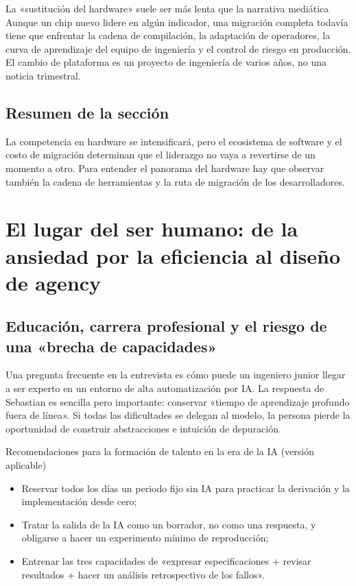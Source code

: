 \documentclass[a4paper]{article}
\begin{document}
\begin{warningbox}{La «sustitución del hardware» suele ser más lenta que la narrativa mediática}
Aunque un chip nuevo lidere en algún indicador, una migración completa todavía tiene que enfrentar la cadena de compilación, la adaptación de operadores, la curva de aprendizaje del equipo de ingeniería y el control de riesgo en producción. El cambio de plataforma es un proyecto de ingeniería de varios años, no una noticia trimestral.
\end{warningbox}

\subsection{Resumen de la sección}

La competencia en hardware se intensificará, pero el ecosistema de software y el costo de migración determinan que el liderazgo no vaya a revertirse de un momento a otro. Para entender el panorama del hardware hay que observar también la cadena de herramientas y la ruta de migración de los desarrolladores.
\section{El lugar del ser humano: de la ansiedad por la eficiencia al diseño de agency}

\subsection{Educación, carrera profesional y el riesgo de una «brecha de capacidades»}

Una pregunta frecuente en la entrevista es cómo puede un ingeniero junior llegar a ser experto en un entorno de alta automatización por IA. La respuesta de Sebastian es sencilla pero importante: conservar «tiempo de aprendizaje profundo fuera de línea». Si todas las dificultades se delegan al modelo, la persona pierde la oportunidad de construir abstracciones e intuición de depuración.

\begin{importantbox}{Recomendaciones para la formación de talento en la era de la IA (versión aplicable)}
\begin{itemize}[leftmargin=1.5em]
    \item Reservar todos los días un periodo fijo sin IA para practicar la derivación y la implementación desde cero;
    \item Tratar la salida de la IA como un borrador, no como una respuesta, y obligarse a hacer un experimento mínimo de reproducción;
    \item Entrenar las tres capacidades de «expresar especificaciones + revisar resultados + hacer un análisis retrospectivo de los fallos».
\end{itemize}
\end{importantbox}
\end{document}
